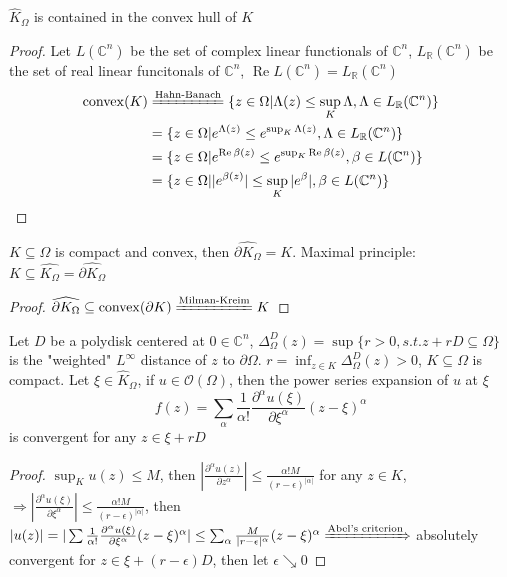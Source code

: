 \documentclass[../main.tex]{subfiles}
\begin{document}
\begin{remark}
$\hat K_\Omega$ is contained in the convex hull of $K$
\end{remark}

\begin{proof}
Let $L(\mathbb C^n)$ be the set of complex linear functionals of $\mathbb C^n$, $L_\mathbb{R}(\mathbb C^n)$ be the set of real linear funcitonals of $\mathbb C^n$, $\operatorname{Re}L(\mathbb C^n)=L_{\mathbb R}(\mathbb C^n)$
\begin{align*}
\operatorname{convex}(K)&\xequal{\text{Hahn-Banach}}\{z\in\Omega|\Lambda(z)\leq\sup_K\Lambda,\Lambda\in L_{\mathbb R}(\mathbb C^n)\} \\
&=\{z\in\Omega|e^{\Lambda(z)}\leq e^{\sup_K\Lambda(z)},\Lambda\in L_{\mathbb R}(\mathbb C^n)\} \\
&=\{z\in\Omega|e^{\operatorname{Re}\beta(z)}\leq e^{\sup_K\operatorname{Re}\beta(z)},\beta\in L(\mathbb C^n)\} \\
&=\{z\in\Omega||e^{\beta(z)}|\leq\sup_K|e^{\beta}|,\beta\in L(\mathbb C^n)\}
\end{align*}
\end{proof}

\begin{remark}
$K\subseteq\Omega$ is compact and convex, then $\widehat{\partial K_{\Omega}}=K$. Maximal principle: $K\subseteq\widehat{K_\Omega}=\widehat{\partial K_\Omega}$
\end{remark}

\begin{proof}
$\widehat{\partial K_{\Omega}}\subseteq\operatorname{convex}(\partial K)\xequal{\text{Milman-Kreim}}K$
\end{proof}

\begin{lemma}\label{Lemma 2.5.3}
Let $D$ be a polydisk centered at $0\in\mathbb C^n$, $\Delta_\Omega^D(z)=\sup\{r>0,s.t. z+rD\subseteq\Omega\}$ is the "weighted" $L^\infty$ distance of $z$ to $\partial\Omega$. $r=\inf_{z\in K}\Delta_\Omega^D(z)>0$, $K\subseteq\Omega$ is compact. Let $\xi\in\hat K_\Omega$, if $u\in\mathcal O(\Omega)$, then the power series expansion of $u$ at $\xi$
\[f(z)=\sum_\alpha\frac{1}{\alpha!}\frac{\partial^\alpha u(\xi)}{\partial\xi^\alpha}(z-\xi)^\alpha\]
is convergent for any $z\in\xi+rD$
\end{lemma}

\begin{proof}
$\sup_Ku(z)\leq M$, then $|\frac{\partial^\alpha u(z)}{\partial z^\alpha}|\leq\frac{\alpha! M}{(r-\epsilon)^{|\alpha|}}$ for any $z\in K$, $\Rightarrow |\frac{\partial^\alpha u(\xi)}{\partial \xi^\alpha}|\leq\frac{\alpha! M}{(r-\epsilon)^{|\alpha|}}$, then $|u(z)|=|\sum\frac{1}{\alpha!}\frac{\partial^\alpha u(\xi)}{\partial\xi^\alpha}(z-\xi)^\alpha|\leq\sum_\alpha\frac{M}{|r-\epsilon|^\alpha}(z-\xi)^\alpha\xRightarrow{\text{Abel's criterion}}$ absolutely convergent for $z\in\xi+(r-\epsilon)D$, then let $\epsilon\searrow0$
\end{proof}
\end{document}
